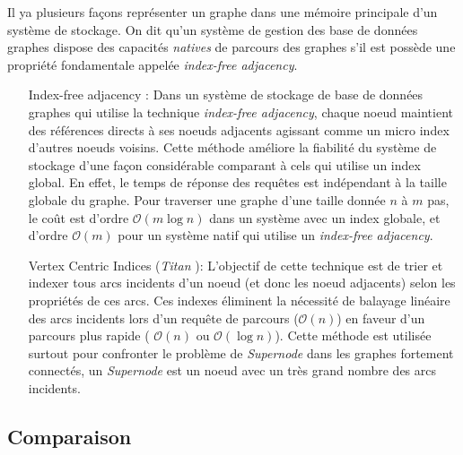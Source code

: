 \begin{itemize}
    Il ya plusieurs façons représenter un graphe dans une mémoire
    principale d'un système de stockage. On dit qu'un système de
    gestion des base de données graphes dispose des capacités
    \emph{natives} de parcours des graphes s'il est possède une
    propriété fondamentale appelée \emph{index-free adjacency}.

    

    \begin{itemize}
    \item [Index-free adjacency]: Dans un système de stockage de base
      de données graphes qui utilise la technique \emph{index-free
        adjacency}, chaque noeud maintient des références directs à
      ses noeuds adjacents agissant comme un micro index d'autres
      noeuds voisins. Cette méthode améliore la fiabilité du système
      de stockage d'une façon considérable comparant à cels qui
      utilise un index global. En effet, le temps de réponse des
      requêtes est indépendant à la taille globale du graphe. Pour
      traverser une graphe d'une taille donnée $n$ à $m$ pas, le coût
      est d'ordre $\mathcal{O}(m\log{}n)$ dans un système avec un
      index globale, et d'ordre $\mathcal{O}(m)$ pour un système natif
      qui utilise un \emph{index-free adjacency}.

      
    \item [Vertex Centric Indices] (\emph{Titan} \cite{vertexci}):
      L'objectif de cette technique est de trier et indexer tous arcs
      incidents d'un noeud (et donc les noeud adjacents) selon les
      propriétés de ces arcs. Ces indexes éliminent la nécessité de
      balayage linéaire des arcs incidents lors d'un requête de
      parcours ($\mathcal{O}(n)$) en faveur d'un parcours plus rapide
      ( $\mathcal{O}(n)$ ou $\mathcal{O}(\log{}n)$). Cette méthode est
      utilisée surtout pour confronter le problème de \emph{Supernode}
      dans les graphes fortement connectés, un \emph{Supernode} est un
      noeud avec un très grand nombre des arcs incidents.
    \end{itemize}


  \subsection{Comparaison}
  \label{sec:graphdb-comp}
\newpage



\end{itemize}

